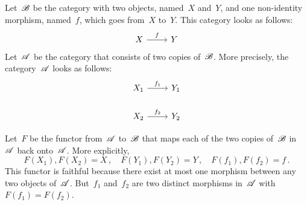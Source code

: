 \subsection{}

Let~$\mathscr{B}$ be the category with two objects, named~$X$ and~$Y$, and one non-identity morphism, named~$f$, which goes from~$X$ to~$Y$.
This category looks as follows:
\[
	\begin{tikzcd}
		X
		\arrow{r}[above]{f}
		&
		Y
	\end{tikzcd}
\]
Let~$\mathscr{A}$ be the category that consists of two copies of~$\mathscr{B}$.
More precisely, the category~$\mathscr{A}$ looks as follows:
\[
	\begin{tikzcd}
		X_1
		\arrow{r}[above]{f_1}
		&
		Y_1
		\\
		X_2
		\arrow{r}[above]{f_2}
		&
		Y_2
	\end{tikzcd}
\]

Let~$F$ be the functor from~$\mathscr{A}$ to~$\mathscr{B}$ that maps each of the two copies of~$\mathscr{B}$ in~$\mathscr{A}$ back onto~$\mathscr{A}$.
More explicitly,
\[
	F(X_1), F(X_2) = X \,,
	\quad
	F(Y_1), F(Y_2) = Y \,,
	\quad
	F(f_1), F(f_2) = f \,.
\]
This functor is faithful because there exist at most one morphism between any two objects of~$\mathscr{A}$.
But~$f_1$ and~$f_2$ are two distinct morphisms in~$\mathscr{A}$ with~$F(f_1) = F(f_2)$.
